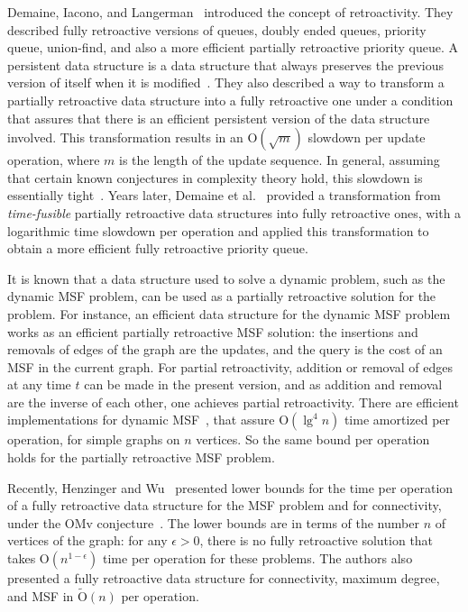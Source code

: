 \documentclass[reqno,11pt]{amsart}
\newcommand{\eps}{\epsilon}
\newcommand{\Oh}{\mathrm{O}}
\begin{document}
Demaine, Iacono, and Langerman~\cite{DemaineIL2007} introduced the concept of retroactivity. 
They described fully retroactive versions of queues, doubly ended queues, priority 
queue, union-find, and also a more efficient partially retroactive priority queue.
A persistent data structure is a data structure that always preserves the 
previous version of itself when it is modified~\cite{DriscollSST1989}.
They also described a way to transform a partially retroactive data structure 
into a fully retroactive one under a condition that assures that there is 
an efficient persistent version of the data structure involved.  
This transformation results in an $\Oh(\sqrt{m})$ 
slowdown per update operation, where $m$ is the length of the update sequence.
In general, assuming that certain known conjectures in complexity theory hold, 
this slowdown is essentially tight~\cite{ChenDGWXY2018}.
Years later, Demaine et al.~\cite{DemaineKLSY2015} provided a transformation 
from \emph{time-fusible} partially retroactive data structures into fully
retroactive ones, with a logarithmic time slowdown per operation and applied
this transformation to obtain a more efficient fully retroactive priority queue.

It is known that a data structure used to solve a dynamic problem, such as the 
dynamic MSF problem, can be used as a partially retroactive solution for the problem.  
For instance, an efficient data structure for the dynamic MSF problem works as an 
efficient partially retroactive MSF solution: the insertions and removals of edges 
of the graph are the updates, and the query is the cost of an MSF in the current graph.  
For partial retroactivity, addition or removal of edges at any time $t$ can be made 
in the present version, and as addition and removal are the inverse of each other, 
one achieves partial retroactivity.  
There are efficient implementations for dynamic MSF~\cite{HolmLT2001,HolmRWN2015}, 
that assure $\Oh(\lg^4 n)$ time amortized per operation, for simple graphs on $n$ vertices. 
So the same bound per operation holds for the partially retroactive MSF problem. 

Recently, Henzinger and Wu~\cite{HenzingerW2021} presented lower bounds for the 
time per operation of a fully retroactive data structure for the MSF problem and 
for connectivity, under the OMv conjecture~\cite{HenzingerKNS2015}.  The lower 
bounds are in terms of the number $n$ of vertices of the graph: for any $\eps>0$,
there is no fully retroactive solution that takes $\Oh(n^{1-\eps})$ time per 
operation for these problems.  The authors also presented a fully retroactive
data structure for connectivity, maximum degree, and MSF in $\tilde{\Oh}(n)$ 
per operation.  
\end{document}
